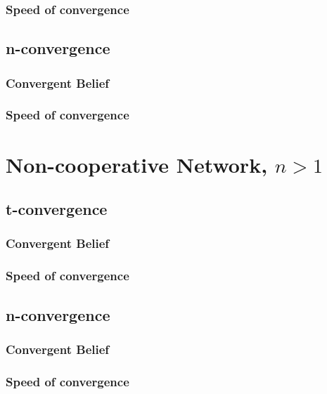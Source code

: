 \documentclass{article}
\begin{document}
\subsubsection{Speed of convergence}
\subsection{n-convergence}
\subsubsection{Convergent Belief}
\subsubsection{Speed of convergence}

\section{Non-cooperative Network, $n>1$}
\subsection{t-convergence}
\subsubsection{Convergent Belief}
\subsubsection{Speed of convergence}
\subsection{n-convergence}
\subsubsection{Convergent Belief}
\subsubsection{Speed of convergence}

\newpage
\end{document}
